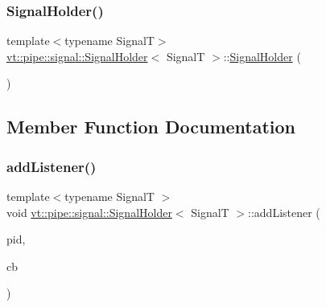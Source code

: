 \subsubsection{\texorpdfstring{Signal\+Holder()}{SignalHolder()}}
{\footnotesize\ttfamily template$<$typename SignalT$>$ \\
\hyperlink{structvt_1_1pipe_1_1signal_1_1_signal_holder}{vt\+::pipe\+::signal\+::\+Signal\+Holder}$<$ SignalT $>$\+::\hyperlink{structvt_1_1pipe_1_1signal_1_1_signal_holder}{Signal\+Holder} (\begin{DoxyParamCaption}{ }\end{DoxyParamCaption})\hspace{0.3cm}{\ttfamily [inline]}}



\subsection{Member Function Documentation}
\mbox{\label{structvt_1_1pipe_1_1signal_1_1_signal_holder_aee30c3b7c07d695450e1d6a9953ee98a}} 
\subsubsection{\texorpdfstring{add\+Listener()}{addListener()}}
{\footnotesize\ttfamily template$<$typename SignalT $>$ \\
void \hyperlink{structvt_1_1pipe_1_1signal_1_1_signal_holder}{vt\+::pipe\+::signal\+::\+Signal\+Holder}$<$ SignalT $>$\+::add\+Listener (\begin{DoxyParamCaption}\item[{\hyperlink{namespacevt_ac9852acda74d1896f48f406cd72c7bd3}{Pipe\+Type} const \&}]{pid,  }\item[{\hyperlink{structvt_1_1pipe_1_1signal_1_1_signal_holder_a23af418129e6e8ecb4ee9621e6fd6f90}{Listener\+Type} \&\&}]{cb }\end{DoxyParamCaption})}

\mbox{\label{structvt_1_1pipe_1_1signal_1_1_signal_holder_ae32b546852bc4518b6d75f2e43a5eb5f}} 
